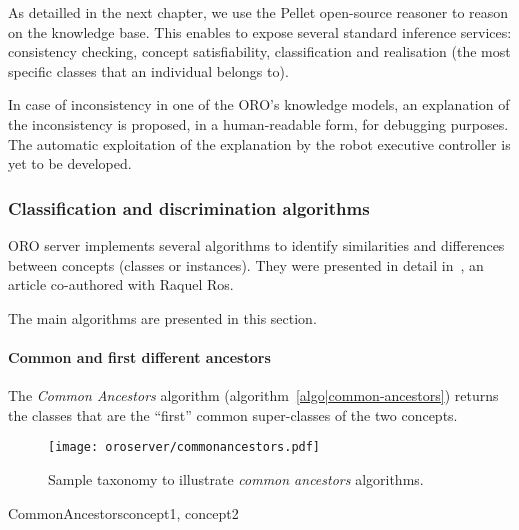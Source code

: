 As detailled in the next chapter, we use the Pellet open-source reasoner to
reason on the knowledge base. This enables to expose several standard inference
services: consistency checking, concept satisfiability, classification and
realisation (the most specific classes that an individual belongs to).

In case of inconsistency in one of the ORO's knowledge models, an explanation
of the inconsistency is proposed, in a human-readable form, for debugging
purposes. The automatic exploitation of the explanation by the robot executive
controller is yet to be developed.

\subsubsection{Classification and discrimination algorithms}
\label{sect|discrimination}

ORO server implements several algorithms to identify similarities and
differences between concepts (classes or instances). They were presented in
detail in~\cite{Ros2010b}, an article co-authored with Raquel Ros.

The main algorithms are presented in this section.

\paragraph{Common and first different ancestors} The \emph{Common Ancestors}
algorithm (algorithm~\ref{algo|common-ancestors}) returns the classes that
are the ``first'' common super-classes of the two concepts.

\begin{figure}
    \centering
    \texttt{[image: oroserver/commonancestors.pdf]}
    \caption{Sample taxonomy to illustrate \emph{common ancestors} algorithms.}
    \label{fig|common-ancestors}
\end{figure}

\small
\begin{pseudocode}[ruled]{CommonAncestors}{concept1, concept2}
\label{algo|common-ancestors}

\BEGIN
{} \GETS {} \cap {} \\
\\
\END

\end{pseudocode}
\normalsize

